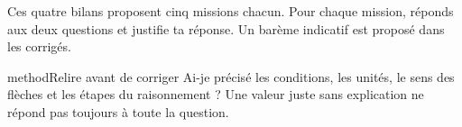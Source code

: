 \documentclass[12pt,twoside,openany]{book}
\begin{document}
\clearpage\gdef\otChapNum{0}\pagestyle{otFront}
\label{bilans-debut}
Ces quatre bilans proposent cinq missions chacun. Pour chaque mission, réponds aux deux questions et justifie ta réponse. Un barème indicatif est proposé dans les corrigés.\par
{}
\begin{pcEncadre}{method}{Relire avant de corriger}
Ai-je précisé les conditions, les unités, le sens des flèches et les étapes du raisonnement ? Une valeur juste sans explication ne répond pas toujours à toute la question.\par
\end{pcEncadre}
\label{bilan-A}
\end{document}
